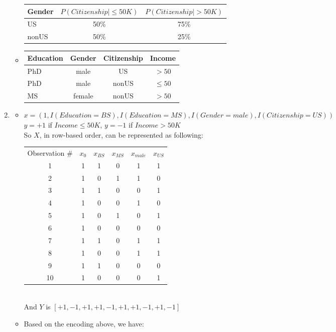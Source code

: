 \documentclass[11pt]{article}
\begin{document}
\begin{onehalfspace}
\begin{enumerate}[label=\alph*]
\begin{itemize}
			\begin{tabular}{| l || c | c |}
			\hline
			Gender & $P(Citizenship|\leq50K)$ & $P(Citizenship|>50K)$ \\ \hline
			US & 50\% & 75\% \\ \hline
			nonUS & 50\% & 25\% \\ \hline
			\end{tabular}
		\item
			\begin{tabular}{| l c | c | c |}
			\hline
			Education & Gender & Citizenship & Income\\ \hline
			PhD & male & US & $>50$\\ \hline
			PhD & male & nonUS & $\leq 50$\\ \hline
			MS & female & nonUS & $>50$ \\ \hline
			\end{tabular}
	\end{itemize}
	\item
	\begin{itemize}
		\item
		$x = (1, I(Education=BS), I(Education=MS), I(Gender=male), I(Citizenship=US))$\\
		$y = +1$ if $Income \leq 50K$, $y = -1$ if $Income > 50K$\\
		So $X$, in row-based order, can be represented as following:\\
		\begin{tabular}{c | c  c  c  c  c}
		Observation \# & $x_0$ & $x_{BS}$ & $x_{MS}$ & $x_{male}$ & $x_{US}$\\
		1 & 1&1&0&1&1\\ \hline
		2 & 1&0&1&1&0\\ \hline
		3 & 1&1&0&0&1\\ \hline
		4 & 1&0&0&1&0\\ \hline
		5 & 1&0&1&0&1\\ \hline
		6 & 1&0&0&0&0\\ \hline
		7 & 1&1&0&1&1\\ \hline
		8 & 1&0&0&1&1\\ \hline
		9 & 1&1&0&0&0\\ \hline
		10 & 1&0&0&0&1\\ \hline
		\end{tabular}\\
		And $Y$ is $[+1,-1,+1,+1,-1,+1,+1,-1,+1,-1]$
		\item Based on the encoding above, we have:\\
			\begin{tabular}{c | c  c  c  c  c}

\end{tabular}
\end{itemize}
\end{enumerate}
\end{onehalfspace}
\end{document}
